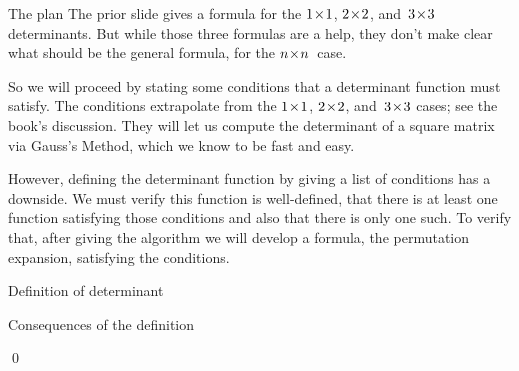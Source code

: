 \begin{frame}
\end{frame}




\begin{frame}{The plan}
The prior slide gives a formula for the $1 \! \times \! 1$, $2 \! \times \! 2$, and~$3 \! \times \! 3$
determinants. 
But while those three formulas are a help, they don't make clear what
should be the general formula, for the $n \! \times \! n$~case.

So we will proceed by stating some conditions that a
determinant function must satisfy. 
The conditions extrapolate from the $1 \! \times \! 1$, $2 \! \times \! 2$, 
and~$3 \! \times \! 3$ cases; see the book's discussion.
They will let us compute the determinant of a square matrix via Gauss's Method, 
which we know to be fast and easy.

\pause
However, defining the determinant function by giving a list of conditions 
has a downside.
We must verify this function is well-defined,
that there is at least one function satisfying those conditions and also that
there is only one such.
To verify that, after giving the algorithm we will develop a formula,
the permutation expansion,
satisfying the conditions. 
\end{frame}




\begin{frame}{Definition of determinant}

\pause 
{}%
\end{frame}




\begin{frame}{Consequences of the definition}
\lm[le:IdenRowsDetZero]

\pause 
\pf 
{}

\pause
{}
\end{frame}
\begin{frame}

\pause
{}  
\end{frame}
\begin{frame}
\qed
\end{frame}




